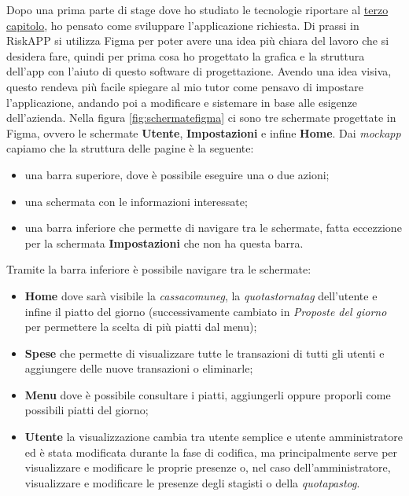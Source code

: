 Dopo una prima parte di stage dove ho studiato le tecnologie riportare al \hyperref[sec:tecnologie]{terzo capitolo}, ho pensato come sviluppare l'applicazione richiesta.\newline
Di prassi in RiskAPP si utilizza Figma per poter avere una idea più chiara del lavoro che si desidera fare, quindi per prima cosa ho progettato la grafica e la struttura dell'app con l'aiuto di questo software di progettazione.\newline
Avendo una idea visiva, questo rendeva più facile spiegare al mio tutor come pensavo di impostare l'applicazione, andando poi a modificare e sistemare in base alle esigenze dell'azienda.\newline
\newline
Nella figura \ref{fig:schermatefigma} ci sono tre schermate progettate in Figma, ovvero le schermate \textbf{Utente}, \textbf{Impostazioni} e infine \textbf{Home}.\newline
Dai \emph{mockapp} capiamo che la struttura delle pagine è la seguente:
\begin{itemize}
    \item una barra superiore, dove è possibile eseguire una o due azioni;
    \item una schermata con le informazioni interessate;
    \item una barra inferiore che permette di navigare tra le schermate, fatta eccezzione per la schermata \textbf{Impostazioni} che non ha questa barra.
\end{itemize}
Tramite la barra inferiore è possibile navigare tra le schermate:
\begin{itemize}
    \item \textbf{Home} dove sarà visibile la \emph{\gls{cassacomuneg}}, la \emph{\gls{quotastornatag}} dell'utente e infine il piatto del giorno (successivamente cambiato in \emph{Proposte del giorno} per permettere la scelta di più piatti dal menu);
    \item \textbf{Spese} che permette di visualizzare tutte le transazioni di tutti gli utenti e aggiungere delle nuove transazioni o eliminarle;
    \item \textbf{Menu} dove è possibile consultare i piatti, aggiungerli oppure proporli come possibili piatti del giorno;
    \item \textbf{Utente} la visualizzazione cambia tra utente semplice e utente amministratore ed è stata modificata durante la fase di codifica, ma principalmente serve per visualizzare e modificare le proprie presenze o, nel caso dell'amministratore, visualizzare e modificare le presenze degli stagisti o della \emph{\gls{quotapastog}}.
\end{itemize}
